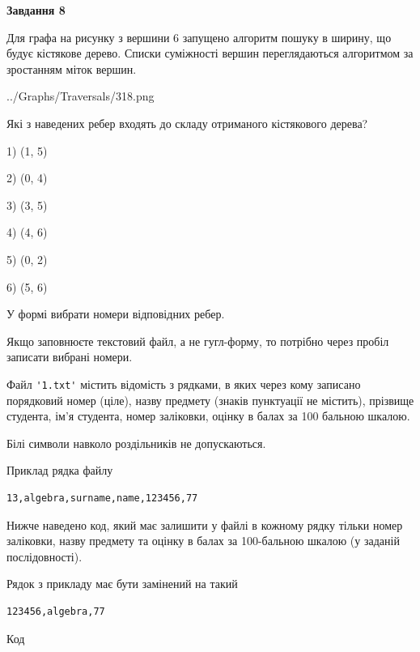 \documentclass[12pt, ukrainian]{article}
\def\code#1{\Verb!#1!}
\begin{document}
{\begin {large}
{\begin {center}\textbf{Завдання 8}\end {center}}\par
Для графа на рисунку з вершини 6 запущено алгоритм пошуку в ширину, що будує кістякове дерево. Списки суміжності вершин переглядаються алгоритмом за зростанням міток вершин.\par
\begin{center}
	{../Graphs/Traversals/318.png}
\end{center}
\par Які з наведених ребер входять до складу отриманого кістякового дерева?\par
1) (1, 5)\par
2) (0, 4)\par
3) (3, 5)\par
4) (4, 6)\par
5) (0, 2)\par
6) (5, 6)\par
{\vskip 15pt} У формі вибрати номери відповідних ребер.


Якщо заповнюєте текстовий файл, а не гугл-форму, то потрібно через пробіл записа\-ти вибрані номери.\par
\newpage


Файл \code{'1.txt'} містить відомість з рядками, в яких через кому записа\-но поряд\-ковий номер (ціле), назву предмету (знаків пунктуації не містить), прізвище студента, ім'я студента, номер заліковки, оцінку в балах за 100 бальною шкалою.

Білі символи навколо роздільників не допускаються.

Приклад рядка файлу



\begin{verbatim}
13,algebra,surname,name,123456,77
\end{verbatim}


Нижче наведено код, який має залишити у файлі в кожному рядку тільки номер заліковки, назву предмету та оцінку в балах за 100-бальною шкалою (у заданій послі\-дов\-ності).

Рядок з прикладу має бути замінений на такий



\begin{verbatim}
123456,algebra,77
\end{verbatim}




Код




\end{large}}
\end{document}
